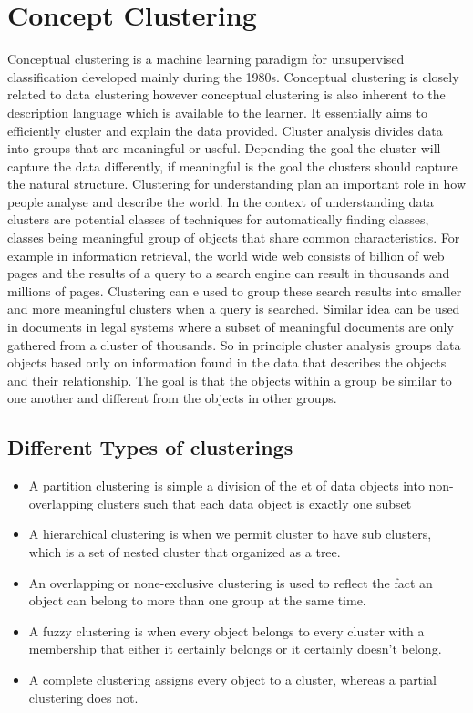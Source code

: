 \documentclass[12pt]{article}
\begin{document}
\section{Concept Clustering}
Conceptual clustering is a machine learning paradigm for unsupervised classification developed mainly during the 1980s. Conceptual clustering is closely related to data clustering however conceptual clustering is also inherent to the description language which is available to the learner. It essentially aims to efficiently cluster and explain the data provided. 
\newline
\newline
Cluster analysis divides data into groups that are meaningful or useful. Depending the goal the cluster will capture the data differently, if meaningful is the goal the clusters should capture the natural structure. Clustering for understanding plan an important role in how people analyse and describe the world. In the context of understanding data clusters are potential classes of techniques for automatically finding classes, classes being meaningful group of objects that share common characteristics. For example in information retrieval, the world wide web consists of billion of web pages and the results of a query to a search engine can result in thousands and millions of pages. Clustering can e used to group these search results into smaller and more meaningful clusters when a query is searched. Similar idea can be used in documents in legal systems where a subset of meaningful documents are only gathered from a cluster of thousands. 
\newline
\newline
So in principle cluster analysis groups data objects based only on information found in the data that describes the objects and their relationship. The goal is that the objects within a group be similar to one another and different from the objects in other groups.

\subsection{Different Types of clusterings}
\begin{itemize}
\item A partition clustering is simple a division of the et of data objects into non-overlapping clusters such that each data object is exactly one subset
\item A hierarchical clustering is when we permit cluster to have sub clusters, which is a set of nested cluster that organized as a tree. 
\item An overlapping or none-exclusive clustering is used to reflect the fact an object can belong to more than one group at the same time.
\item A fuzzy clustering is when every object belongs to every cluster with a membership that either it certainly belongs or it certainly doesn't belong. 
\item A complete clustering assigns every object to a cluster, whereas a partial clustering does not. 
\end{itemize}
\end{document}
